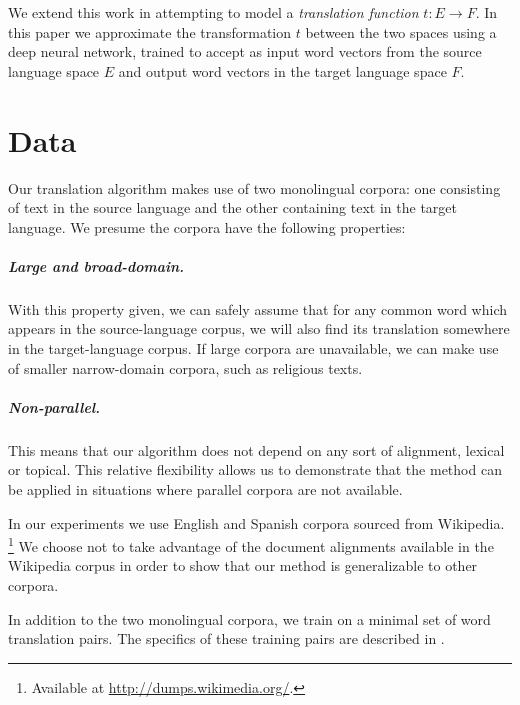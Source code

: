 \documentclass[11pt]{article}
\begin{document}
We extend this work in attempting to model a \emph{translation function} $t : E \to F$.
In this paper we approximate the transformation $t$ between the two spaces using a deep neural
network, trained to accept as input word vectors from the source language space
$E$ and output word vectors in the target language space $F$.


\section{Data}
\label{sec:data}

Our translation algorithm makes use of two monolingual corpora: one consisting of text
in the source language and the other containing text in the target language. We presume
the corpora have the following properties:
\subparagraph{Large and broad-domain.} With this property given, we can safely assume
that for any common
word which appears in the source-language corpus, we will also find its
translation somewhere in the target-language corpus.
If large corpora are unavailable, we can make use of smaller narrow-domain corpora, such as religious texts.
\subparagraph{Non-parallel.} This means that our algorithm does not depend on any sort
of alignment, lexical or topical. This relative flexibility allows us to demonstrate
that the method can be applied in situations where parallel corpora are not available.

In our experiments we use English and Spanish corpora sourced from Wikipedia.%
\footnote{Available at \url{http://dumps.wikimedia.org/}.}
We choose not to take advantage of the document alignments available in the Wikipedia corpus in order to show that our method is generalizable to other corpora.

In addition to the two monolingual corpora, we train on a minimal
set of word translation pairs.
The specifics of these training pairs are described in .
\end{document}
